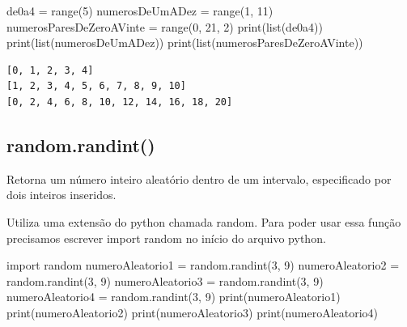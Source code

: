 \documentclass[
  letterpaper,
  DIV=11,
  numbers=noendperiod]{scrreprt}
\newenvironment{Shaded}{\begin{snugshade}}{\end{snugshade}}
\newcommand{\BuiltInTok}[1]{\textcolor[rgb]{0.00,0.23,0.31}{#1}}
\newcommand{\DecValTok}[1]{\textcolor[rgb]{0.68,0.00,0.00}{#1}}
\newcommand{\ImportTok}[1]{\textcolor[rgb]{0.00,0.46,0.62}{#1}}
\newcommand{\NormalTok}[1]{\textcolor[rgb]{0.00,0.23,0.31}{#1}}
\newcommand{\OperatorTok}[1]{\textcolor[rgb]{0.37,0.37,0.37}{#1}}
\begin{document}
\begin{Shaded}
\begin{Highlighting}[]
\NormalTok{de0a4 }\OperatorTok{=} \BuiltInTok{range}\NormalTok{(}\DecValTok{5}\NormalTok{)}
\NormalTok{numerosDeUmADez }\OperatorTok{=} \BuiltInTok{range}\NormalTok{(}\DecValTok{1}\NormalTok{, }\DecValTok{11}\NormalTok{)}
\NormalTok{numerosParesDeZeroAVinte }\OperatorTok{=} \BuiltInTok{range}\NormalTok{(}\DecValTok{0}\NormalTok{, }\DecValTok{21}\NormalTok{, }\DecValTok{2}\NormalTok{)}
\BuiltInTok{print}\NormalTok{(}\BuiltInTok{list}\NormalTok{(de0a4))}
\BuiltInTok{print}\NormalTok{(}\BuiltInTok{list}\NormalTok{(numerosDeUmADez))}
\BuiltInTok{print}\NormalTok{(}\BuiltInTok{list}\NormalTok{(numerosParesDeZeroAVinte))}
\end{Highlighting}
\end{Shaded}

\begin{tcolorbox}[enhanced jigsaw, breakable, leftrule=.75mm, left=2mm, opacityback=0, bottomrule=.15mm, toprule=.15mm, rightrule=.15mm, arc=.35mm, colback=white]

\begin{verbatim}
[0, 1, 2, 3, 4]
[1, 2, 3, 4, 5, 6, 7, 8, 9, 10]
[0, 2, 4, 6, 8, 10, 12, 14, 16, 18, 20]
\end{verbatim}

\end{tcolorbox}

\hypertarget{random.randint}{%
\subsection{random.randint()}\label{random.randint}}

Retorna um número inteiro aleatório dentro de um intervalo, especificado
por dois inteiros inseridos.

Utiliza uma extensão do python chamada random. Para poder usar essa
função precisamos escrever import random no início do arquivo python.

\begin{Shaded}
\begin{Highlighting}[]
\ImportTok{import}\NormalTok{ random}
\NormalTok{numeroAleatorio1 }\OperatorTok{=}\NormalTok{ random.randint(}\DecValTok{3}\NormalTok{, }\DecValTok{9}\NormalTok{)}
\NormalTok{numeroAleatorio2 }\OperatorTok{=}\NormalTok{ random.randint(}\DecValTok{3}\NormalTok{, }\DecValTok{9}\NormalTok{)}
\NormalTok{numeroAleatorio3 }\OperatorTok{=}\NormalTok{ random.randint(}\DecValTok{3}\NormalTok{, }\DecValTok{9}\NormalTok{)}
\NormalTok{numeroAleatorio4 }\OperatorTok{=}\NormalTok{ random.randint(}\DecValTok{3}\NormalTok{, }\DecValTok{9}\NormalTok{)}
\BuiltInTok{print}\NormalTok{(numeroAleatorio1)}
\BuiltInTok{print}\NormalTok{(numeroAleatorio2)}
\BuiltInTok{print}\NormalTok{(numeroAleatorio3)}
\BuiltInTok{print}\NormalTok{(numeroAleatorio4)}
\end{Highlighting}
\end{Shaded}
\end{document}
